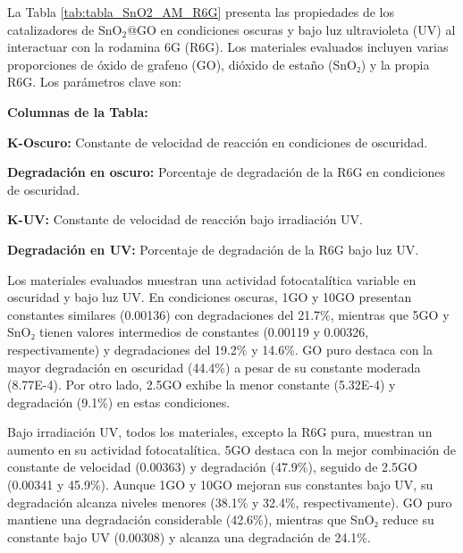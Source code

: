 \documentclass[12pt]{article}
\begin{document}
La Tabla \ref{tab:tabla_SnO2_AM_R6G} presenta las propiedades de los catalizadores de SnO$\displaystyle _{2}$@GO en condiciones oscuras y bajo luz ultravioleta (UV) al interactuar con la rodamina 6G (R6G). Los materiales evaluados incluyen varias proporciones de óxido de grafeno (GO), dióxido de estaño (SnO₂) y la propia R6G. Los parámetros clave son:\vspace{1em} %

\begin{undefined}
\textbf{{\large Columnas de la Tabla:}}
\end{undefined}

\item \textbf{K-Oscuro:} Constante de velocidad de reacción en condiciones de oscuridad.
\item \textbf{Degradación en oscuro:} Porcentaje de degradación de la R6G en condiciones de oscuridad.
\item \textbf{K-UV:} Constante de velocidad de reacción bajo irradiación UV.
\item \textbf{Degradación en UV:} Porcentaje de degradación de la R6G bajo luz UV.\vspace{1em} %


Los materiales evaluados muestran una actividad fotocatalítica variable en oscuridad y bajo luz UV. En condiciones oscuras, 1GO y 10GO presentan constantes similares (0.00136) con degradaciones del 21.7\%, mientras que 5GO y SnO₂ tienen valores intermedios de constantes (0.00119 y 0.00326, respectivamente) y degradaciones del 19.2\% y 14.6\%. GO puro destaca con la mayor degradación en oscuridad (44.4\%) a pesar de su constante moderada (8.77E-4). Por otro lado, 2.5GO exhibe la menor constante (5.32E-4) y degradación (9.1\%) en estas condiciones.\vspace{1em} %

Bajo irradiación UV, todos los materiales, excepto la R6G pura, muestran un aumento en su actividad fotocatalítica. 5GO destaca con la mejor combinación de constante de velocidad (0.00363) y degradación (47.9\%), seguido de 2.5GO (0.00341 y 45.9\%). Aunque 1GO y 10GO mejoran sus constantes bajo UV, su degradación alcanza niveles menores (38.1\% y 32.4\%, respectivamente). GO puro mantiene una degradación considerable (42.6\%), mientras que SnO₂ reduce su constante bajo UV (0.00308) y alcanza una degradación de 24.1\%.\vspace{1em} %
\end{document}
